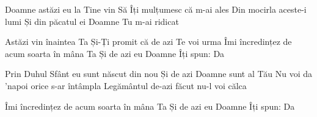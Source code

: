 
\beginverse
Doamne astăzi eu la Tine vin
Să Îți mulțumesc că m-ai ales
Din mocirla aceste-i lumi
Și din păcatul ei
Doamne Tu m-ai ridicat
\endverse

\beginchorus
Astăzi vin înaintea Ta
Și-Ți promit că de azi Te voi urma
Îmi încredințez de acum soarta în mâna Ta
Și de azi eu Doamne Îți spun: Da
\endchorus

\beginverse
Prin Duhul Sfânt eu sunt născut din nou
Și de azi Doamne sunt al Tău
Nu voi da ’napoi orice s-ar întâmpla
Legământul de-azi făcut nu-l voi călca
\endverse

\beginverse
Îmi încredințez de acum soarta în mâna Ta
Și de azi eu Doamne Îți spun: Da
\endverse

\endsong